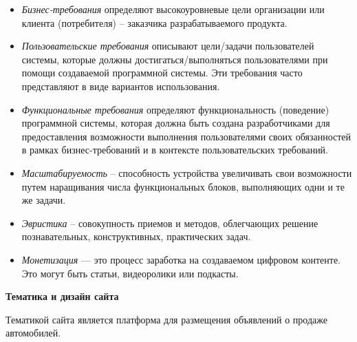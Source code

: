 \begin{itemize}
    \item \textit{Бизнес-требования} определяют высокоуровневые цели организации или клиента (потребителя) – заказчика разрабатываемого продукта.
    \item \textit{Пользовательские требования} описывают цели/задачи пользователей системы, которые должны достигаться/выполняться пользователями при помощи создаваемой программной системы. Эти требования часто представляют в виде вариантов использования.
    \item \textit{Функциональные требования} определяют функциональность (поведение) программной системы, которая должна быть создана разработчиками для предоставления возможности выполнения пользователями своих обязанностей в рамках бизнес-требований и в контексте пользовательских требований.
    \item \textit{Масштабируемость} – способность устройства увеличивать свои возможности путем наращивания числа функциональных блоков, выполняющих одни и те же задачи.
    \item \textit{Эвристика} – совокупность приемов и методов, облегчающих решение познавательных, конструктивных, практических задач.
    \item \textit{Монетизация} — это процесс заработка на создаваемом  цифровом контенте. Это могут быть статьи, видеоролики или подкасты.
\end{itemize}
\bigskip

\textbf{Тематика и дизайн сайта}

Тематикой сайта является платформа для размещения объявлений о продаже автомобилей.

